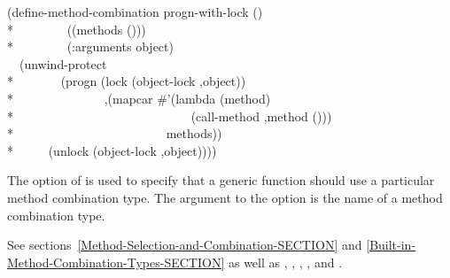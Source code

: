 \begin{defmac}
\begin{lisp}
(define-method-combination progn-with-lock () \\*
~~~~~~~~((methods ())) \\*
~~~~~~~~(:arguments object) \\
~~{\Xbq}(unwind-protect \\*
~~~~~~~(progn (lock (object-lock ,object)) \\*
~~~~~~~~~~~~~~,{\Xatsign}(mapcar \#'(lambda (method) \\*
~~~~~~~~~~~~~~~~~~~~~~~~~~~~{\Xbq}(call-method ,method ())) \\*
~~~~~~~~~~~~~~~~~~~~~~~~methods)) \\*
~~~~~(unlock (object-lock ,object))))
\end{lisp}



The  option of  is used to
specify that a generic function should use a particular method
combination type.  The argument to the 
option is the name of a method combination type.
 
See sections~\ref{Method-Selection-and-Combination-SECTION} and
\ref{Built-in-Method-Combination-Types-SECTION} as well as
,
,
,
,
and .
\end{defmac}



